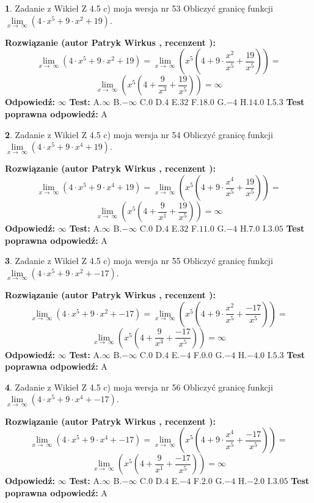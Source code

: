 \documentclass[12pt, a4paper]{article}
\theoremstyle{definition} %
\newtheorem{zad}{}
\newcommand{\zadStart}[1]{\begin{zad}#1\newline}
\newcommand{\zadStop}{\end{zad}}
\newcommand{\rozwStart}[2]{\noindent \textbf{Rozwiązanie (autor #1 , recenzent #2): }\newline}
\newcommand{\rozwStop}{\newline}
\newcommand{\odpStart}{\noindent \textbf{Odpowiedź:}\newline}
\newcommand{\odpStop}{\newline}
\newcommand{\testStart}{\noindent \textbf{Test:}\newline}
\newcommand{\testStop}{\newline}
\newcommand{\kluczStart}{\noindent \textbf{Test poprawna odpowiedź:}\newline}
\newcommand{\kluczStop}{\newline}
\begin{document}
\zadStart{Zadanie z Wikieł Z 4.5 c) moja wersja nr 53}
Obliczyć granicę funkcji  $\lim\limits_{x\to\ \infty}(4 \cdot x^{5}+9 \cdot x^{2}+19)$.
\zadStop
\rozwStart{Patryk Wirkus}{}
$$\lim\limits_{x\to\ \infty}(4 \cdot x^{5}+9 \cdot x^{2}+19) = \lim\limits_{x\to\ \infty}(x^{5}(4 +9 \cdot \frac{x^{2}}{x^{5}}+\frac{19}{x^{5}})) =$$ $$\lim\limits_{x\to\ \infty}(x^{5}(4 +\frac{9}{x^{3}}+\frac{19}{x^{5}})) =\infty$$
\rozwStop
\odpStart
$\infty$
\odpStop
\testStart
A.$\infty$ B.$-\infty$ C.$0$ D.$4$ E.$32$
F.$18.0$ G.$-4$
H.$14.0$
I.$5.3$
\testStop
\kluczStart
A
\kluczStop



\zadStart{Zadanie z Wikieł Z 4.5 c) moja wersja nr 54}
Obliczyć granicę funkcji  $\lim\limits_{x\to\ \infty}(4 \cdot x^{5}+9 \cdot x^{4}+19)$.
\zadStop
\rozwStart{Patryk Wirkus}{}
$$\lim\limits_{x\to\ \infty}(4 \cdot x^{5}+9 \cdot x^{4}+19) = \lim\limits_{x\to\ \infty}(x^{5}(4 +9 \cdot \frac{x^{4}}{x^{5}}+\frac{19}{x^{5}})) =$$ $$\lim\limits_{x\to\ \infty}(x^{5}(4 +\frac{9}{x^{1}}+\frac{19}{x^{5}})) =\infty$$
\rozwStop
\odpStart
$\infty$
\odpStop
\testStart
A.$\infty$ B.$-\infty$ C.$0$ D.$4$ E.$32$
F.$11.0$ G.$-4$
H.$7.0$
I.$3.05$
\testStop
\kluczStart
A
\kluczStop



\zadStart{Zadanie z Wikieł Z 4.5 c) moja wersja nr 55}
Obliczyć granicę funkcji  $\lim\limits_{x\to\ \infty}(4 \cdot x^{5}+9 \cdot x^{2}+-17)$.
\zadStop
\rozwStart{Patryk Wirkus}{}
$$\lim\limits_{x\to\ \infty}(4 \cdot x^{5}+9 \cdot x^{2}+-17) = \lim\limits_{x\to\ \infty}(x^{5}(4 +9 \cdot \frac{x^{2}}{x^{5}}+\frac{-17}{x^{5}})) =$$ $$\lim\limits_{x\to\ \infty}(x^{5}(4 +\frac{9}{x^{3}}+\frac{-17}{x^{5}})) =\infty$$
\rozwStop
\odpStart
$\infty$
\odpStop
\testStart
A.$\infty$ B.$-\infty$ C.$0$ D.$4$ E.$-4$
F.$0.0$ G.$-4$
H.$-4.0$
I.$5.3$
\testStop
\kluczStart
A
\kluczStop



\zadStart{Zadanie z Wikieł Z 4.5 c) moja wersja nr 56}
Obliczyć granicę funkcji  $\lim\limits_{x\to\ \infty}(4 \cdot x^{5}+9 \cdot x^{4}+-17)$.
\zadStop
\rozwStart{Patryk Wirkus}{}
$$\lim\limits_{x\to\ \infty}(4 \cdot x^{5}+9 \cdot x^{4}+-17) = \lim\limits_{x\to\ \infty}(x^{5}(4 +9 \cdot \frac{x^{4}}{x^{5}}+\frac{-17}{x^{5}})) =$$ $$\lim\limits_{x\to\ \infty}(x^{5}(4 +\frac{9}{x^{1}}+\frac{-17}{x^{5}})) =\infty$$
\rozwStop
\odpStart
$\infty$
\odpStop
\testStart
A.$\infty$ B.$-\infty$ C.$0$ D.$4$ E.$-4$
F.$2.0$ G.$-4$
H.$-2.0$
I.$3.05$
\testStop
\kluczStart
A
\kluczStop
\end{document}
